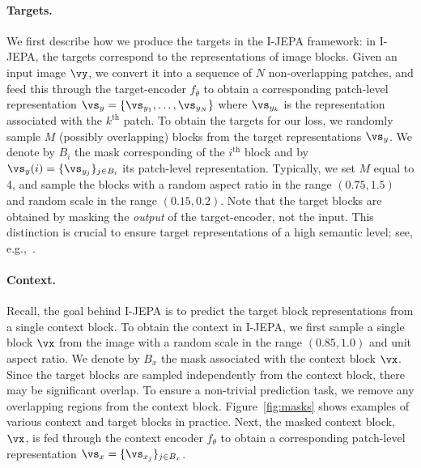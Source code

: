 \documentclass[10pt,twocolumn,letterpaper]{article}
\newcommand{\putalg}{{I-JEPA}\xspace}
\begin{document}
\paragraph{Targets.}
We first describe how we produce the targets in the \putalg framework: in \putalg, the targets correspond to the representations of image blocks.
Given an input image $\vy$, we convert it into a sequence of $N$ non-overlapping patches, and feed this through the target-encoder $f_{\bar{\theta}}$ to obtain a corresponding patch-level representation $\vs_y=\{\vs_{y_1}, \dots, \vs_{y_N}\}$ where $\vs_{y_k}$ is the representation associated with the $k^\text{th}$ patch.
To obtain the targets for our loss, we randomly sample $M$ (possibly overlapping) blocks from the target representations $\vs_y$.
We denote by $B_i$ the mask corresponding of the $i^\text{th}$ block and by $\vs_y(i)=\{\vs_{y_{j}}\}_{j \in B_i}$ its patch-level representation.
Typically, we set $M$ equal to 4, and sample the blocks with a random aspect ratio in the range $(0.75, 1.5)$ and random scale in the range $(0.15, 0.2)$.
Note that the target blocks are obtained by masking the \emph{output} of the target-encoder, not the input.
This distinction is crucial to ensure target representations of a high semantic level; see, e.g.,~\cite{baevski2022data2vec}.

\paragraph{Context.}
Recall, the goal behind \putalg is to predict the target block representations from a single context block.
To obtain the context in \putalg, we first sample a single block $\vx$ from the image with a random scale in the range $(0.85, 1.0)$ and unit aspect ratio. We denote by $B_x$ the mask associated with the context block $\vx$.
Since the target blocks are sampled independently from the context block, there may be significant overlap.
To ensure a non-trivial prediction task, we remove any overlapping regions from the context block.
Figure~\ref{fig:masks} shows examples of various context and target blocks in practice.
Next, the masked context block, $\vx$, is fed through the context encoder  $f_\theta$ to obtain a corresponding patch-level representation $\vs_x=\{\vs_{x_j}\}_{j \in B_x}$.
\end{document}
